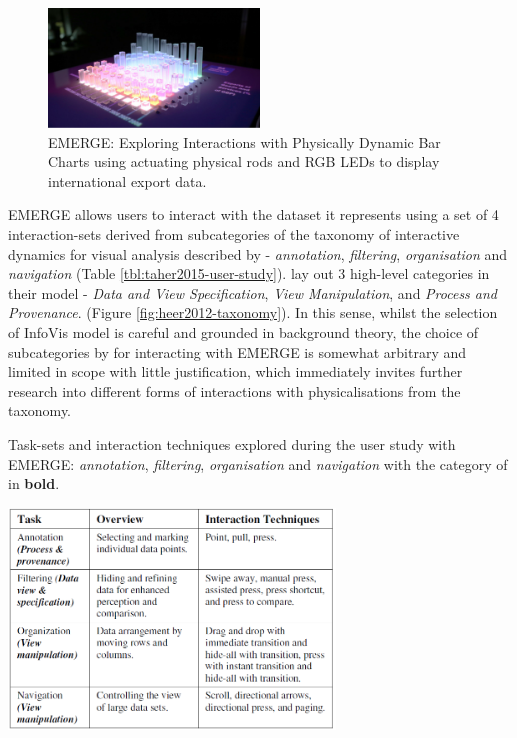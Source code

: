 \documentclass[11pt]{article}
\begin{document}
\begin{figure}[H]
\centering
\includegraphics[width=0.5\textwidth]{img/taher2015-emerge.png} 
\caption{EMERGE: Exploring Interactions with Physically Dynamic Bar Charts using actuating physical rods and RGB LEDs to display international export data.}\label{fig:taher2015-emerge}
\end{figure}

EMERGE allows users to interact with the dataset it represents using a set of 4 interaction-sets derived from subcategories of the taxonomy of interactive dynamics for visual analysis described by \citet{heer2012} - \textit{annotation}, \textit{filtering}, \textit{organisation} and \textit{navigation} (Table \ref{tbl:taher2015-user-study}).  \citeauthor{heer2012} lay out 3 high-level categories in their model - \textit{Data and View Specification}, \textit{View Manipulation}, and \textit{Process and Provenance}. (Figure \ref{fig:heer2012-taxonomy}). In this sense, whilst the selection of InfoVis model is careful and grounded in background theory, the choice of subcategories by \citeauthor{taher2015} for interacting with EMERGE is somewhat arbitrary and limited in scope with little justification, which immediately invites further research into different forms of interactions with physicalisations from the taxonomy.

\begin{table}[H]
\centering
\caption{Task-sets and interaction techniques explored during the user study with EMERGE: \textit{annotation}, \textit{filtering}, \textit{organisation} and \textit{navigation} with the category of \protect\citet{heer2012} in \textbf{bold}.}\label{tbl:taher2015-user-study}
\includegraphics[width=0.65\textwidth]{img/taher2015-user-study.png} 
\end{table}
\end{document}
